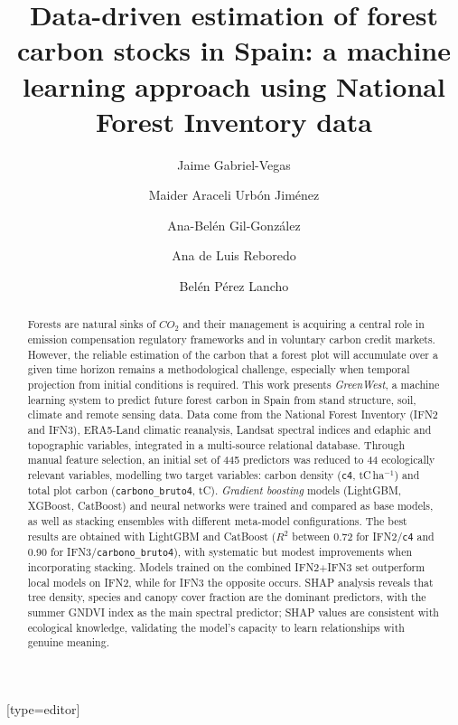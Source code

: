 \documentclass[a4paper,fleqn]{cas-dc}
\numberwithin{equation}{section}
\numberwithin{figure}{section}
\numberwithin{table}{section}
\begin{document}

\title [mode = title]{Data-driven estimation of forest carbon stocks in Spain: a machine learning approach using National Forest Inventory data}

\author[1]{Jaime Gabriel-Vegas}[type=editor]

\author[1]{Maider Araceli Urbón Jiménez}

\author[1]{Ana-Belén Gil-González}
\cormark[1]

\author[1]{Ana de Luis Reboredo}

\author[1]{Belén Pérez Lancho}



\begin{abstract}
Forests are natural sinks of \(CO_2\) and their management is acquiring a central role in emission compensation regulatory frameworks and in voluntary carbon credit markets. However, the reliable estimation of the carbon that a forest plot will accumulate over a given time horizon remains a methodological challenge, especially when temporal projection from initial conditions is required. This work presents \textit{GreenWest}, a machine learning system to predict future forest carbon in Spain from stand structure, soil, climate and remote sensing data. Data come from the National Forest Inventory (IFN2 and IFN3), ERA5-Land climatic reanalysis, Landsat spectral indices and edaphic and topographic variables, integrated in a multi-source relational database. Through manual feature selection, an initial set of 445 predictors was reduced to 44 ecologically relevant variables, modelling two target variables: carbon density (\texttt{c4}, tC\,ha$^{-1}$) and total plot carbon (\texttt{carbono\_bruto4}, tC). \textit{Gradient boosting} models (LightGBM, XGBoost, CatBoost) and neural networks were trained and compared as base models, as well as stacking ensembles with different meta-model configurations. The best results are obtained with LightGBM and CatBoost ($R^2$ between 0.72 for IFN2/\texttt{c4} and 0.90 for IFN3/\texttt{carbono\_bruto4}), with systematic but modest improvements when incorporating stacking. Models trained on the combined IFN2$+$IFN3 set outperform local models on IFN2, while for IFN3 the opposite occurs. SHAP analysis reveals that tree density, species and canopy cover fraction are the dominant predictors, with the summer GNDVI index as the main spectral predictor; SHAP values are consistent with ecological knowledge, validating the model's capacity to learn relationships with genuine meaning.
\end{abstract}
\end{document}
